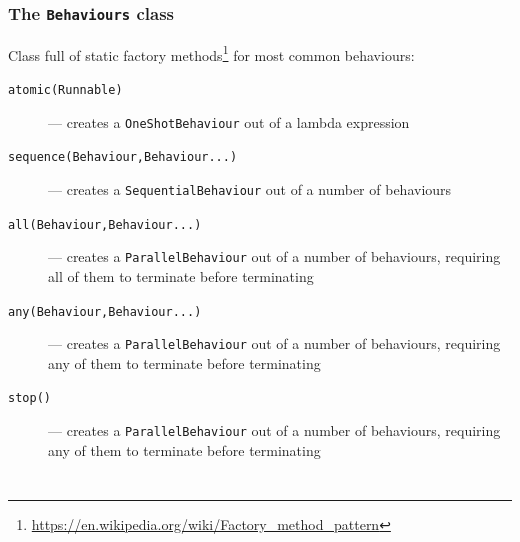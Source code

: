 \documentclass{beamer}\mode<presentation>{\usetheme{AMSCesenaPurpleAndGold}}
\begin{document}
\begin{frame}[allowframebreaks]\frametitle{The \texttt{Behaviour\textbf{s}} class}
    Class full of \alert{static factory methods}\footnote{\url{https://en.wikipedia.org/wiki/Factory_method_pattern}} for most common behaviours:
    \begin{description}
        \item[\texttt{atomic(Runnable)}] --- creates a \texttt{OneShotBehaviour} out of a lambda expression
        \item[\texttt{sequence(Behaviour,Behaviour...)}] --- creates a \texttt{SequentialBehaviour} out of a number of behaviours
        \item[\texttt{all(Behaviour,Behaviour...)}] --- creates a \texttt{ParallelBehaviour} out of a number of behaviours, requiring \alert{all} of them to terminate before terminating
        \item[\texttt{any(Behaviour,Behaviour...)}] --- creates a \texttt{ParallelBehaviour} out of a number of behaviours, requiring \alert{any} of them to terminate before terminating
        \item[\texttt{stop()}] --- creates a \texttt{ParallelBehaviour} out of a number of behaviours, requiring \alert{any} of them to terminate before terminating
    \end{description}
\end{frame}



\section*{}
\frame{\titlepage}
\end{document}
